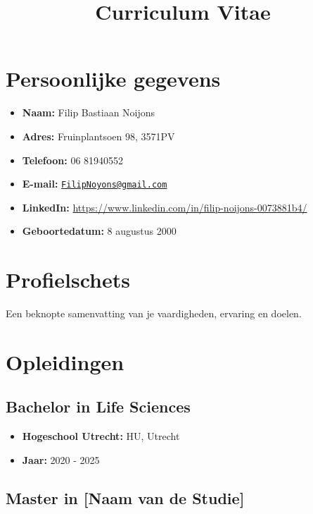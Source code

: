 \documentclass[
]{article}
\title{Curriculum Vitae}
\author{}
\date{\vspace{-2.5em}}
\providecommand{\tightlist}{%
  \setlength{\itemsep}{0pt}\setlength{\parskip}{0pt}}
\begin{document}
\maketitle

\hypertarget{persoonlijke-gegevens}{%
\section{Persoonlijke gegevens}\label{persoonlijke-gegevens}}

\begin{itemize}
\tightlist
\item
  \textbf{Naam:} Filip Bastiaan Noijons
\item
  \textbf{Adres:} Fruinplantsoen 98, 3571PV
\item
  \textbf{Telefoon:} 06 81940552
\item
  \textbf{E-mail:}
  \href{mailto:FilipNoyons@gmail.com}{\nolinkurl{FilipNoyons@gmail.com}}
\item
  \textbf{LinkedIn:}
  \url{https://www.linkedin.com/in/filip-noijons-0073881b4/}
\item
  \textbf{Geboortedatum:} 8 augustus 2000
\end{itemize}

\hypertarget{profielschets}{%
\section{Profielschets}\label{profielschets}}

Een beknopte samenvatting van je vaardigheden, ervaring en doelen.

\hypertarget{opleidingen}{%
\section{Opleidingen}\label{opleidingen}}

\hypertarget{bachelor-in-life-sciences}{%
\subsection{Bachelor in Life Sciences}\label{bachelor-in-life-sciences}}

\begin{itemize}
\tightlist
\item
  \textbf{Hogeschool Utrecht:} HU, Utrecht
\item
  \textbf{Jaar:} 2020 - 2025
\end{itemize}

\hypertarget{master-in-naam-van-de-studie}{%
\subsection{Master in {[}Naam van de
Studie{]}}\label{master-in-naam-van-de-studie}}
\end{document}
